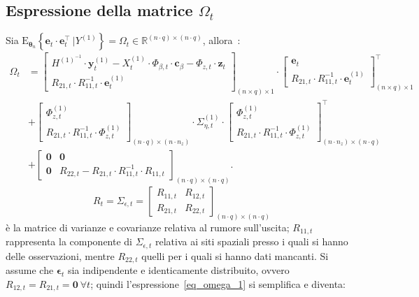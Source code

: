 \subsection[Espressione della matrice $\Omega_t$]{Espressione della matrice $\Omega_t$}
Sia $\text{E}_{\boldsymbol{\theta}_n}\left\{\mathbf{e}_t\cdot\mathbf{e}_t^\top \ \bigg|Y^{(1)}\right\} = \Omega_t\in\mathbb{R}^{(n\cdot q)\times(n\cdot q)}$, allora~\citep{paper_TS_book}:
\begin{equation}
	\begin{split}
		\Omega_t & = \begin{bmatrix}
			H^{(1)^{-1}}\cdot\mathbf{y}_t^{(1)} - X_t^{(1)}\cdot\Phi_{\beta, t}\cdot\mathbf{c}_\beta - \Phi_{z, t}\cdot\mathbf{z}_t \\
			R_{21, t}\cdot R_{11,t}^{-1}\cdot\mathbf{e}_t^{(1)}
		\end{bmatrix}_{(n\times q)\times 1} \cdot \begin{bmatrix}
		\mathbf{e}_t \\
		R_{21,t}\cdot R_{11, t}^{-1}\cdot\mathbf{e}_t^{(1)}
	\end{bmatrix}^\top_{(n\times q)\times 1} \\
	& + \begin{bmatrix}
		\Phi_{z,t}^{(1)} \\
		R_{21, t}\cdot R_{11, t}^{-1}\cdot\Phi_{z,t}^{(1)}
	\end{bmatrix}_{(n\cdot q)\times(n\cdot n_z)}\cdot\Sigma_{\eta, t}^{(1)}\cdot \begin{bmatrix}
		\Phi_{z,t}^{(1)} \\
	R_{21, t}\cdot R_{11, t}^{-1}\cdot\Phi_{z,t}^{(1)}
	\end{bmatrix}^\top_{(n\cdot n_z)\times(n\cdot q)} \\
	& + \begin{bmatrix}
		\mathbf{0} & \mathbf{0}\\
		\mathbf{0} & R_{22,t} - R_{21,t}\cdot R_{11,t}^{-1}\cdot R_{11, t}
	\end{bmatrix}_{(n\cdot q)\times(n\cdot q)}.
	\end{split}
	\label{eq_omega_1}
\end{equation}
\[
	R_t = \Sigma_{\epsilon, t} = \begin{bmatrix}
		R_{11, t} & R_{12, t} \\ R_{21, t} & R_{22, t}
	\end{bmatrix}_{(n\cdot q)\times(n\cdot q)}
\]
è la matrice di varianze e covarianze relativa al rumore sull'uscita; $R_{11, t}$ rappresenta la componente di $\Sigma_{\epsilon, t}$ relativa ai siti spaziali presso i quali si hanno delle osservazioni, mentre $R_{22, t}$ quelli per i quali si hanno dati mancanti. Si assume che $\boldsymbol{\epsilon}_t$ sia indipendente e identicamente distribuito, ovvero $R_{12, t} = R_{21, t} = \mathbf{0} \ \forall t$; quindi l'espressione~\ref{eq_omega_1} si semplifica e diventa:

